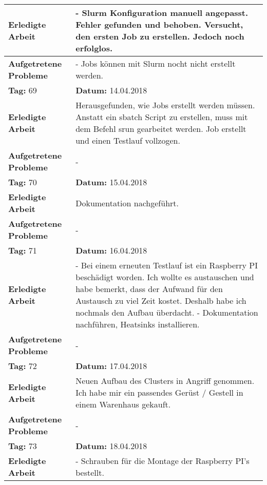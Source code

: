 \begin{longtable}{|p{5cm}|p{5cm}p{6cm}|}
\textbf{Erledigte Arbeit} & \multicolumn{2}{p{11cm}|}{- Slurm Konfiguration manuell angepasst. Fehler gefunden und behoben. Versucht, den ersten Job zu erstellen. Jedoch noch erfolglos.} \\ \hline
\textbf{Aufgetretene Probleme} & \multicolumn{2}{p{11cm}|}{- Jobs können mit Slurm nocht nicht erstellt werden.} \\ \hline
\rowcolor{heading}\textbf{Tag:} 69 & \textbf{Datum:} 14.04.2018 & \\ \hline
\textbf{Erledigte Arbeit} & \multicolumn{2}{p{11cm}|}{Herausgefunden, wie Jobs erstellt werden müssen. Anstatt ein sbatch Script zu erstellen, muss mit dem Befehl srun gearbeitet werden. Job erstellt und einen Testlauf vollzogen.} \\ \hline
\textbf{Aufgetretene Probleme} & \multicolumn{2}{p{11cm}|}{-} \\ \hline
\rowcolor{heading}\textbf{Tag:} 70 & \textbf{Datum:} 15.04.2018 & \\ \hline
\textbf{Erledigte Arbeit} & \multicolumn{2}{p{11cm}|}{Dokumentation nachgeführt.} \\ \hline
\textbf{Aufgetretene Probleme} & \multicolumn{2}{p{11cm}|}{-} \\ \hline
\rowcolor{heading}\textbf{Tag:} 71 & \textbf{Datum:} 16.04.2018 & \\ \hline
\textbf{Erledigte Arbeit} & \multicolumn{2}{p{11cm}|}{- Bei einem erneuten Testlauf ist ein Raspberry PI beschädigt worden. Ich wollte es austauschen und habe bemerkt, dass der Aufwand für den Austausch zu viel Zeit kostet. Deshalb habe ich nochmals den Aufbau überdacht. \newline 
- Dokumentation nachführen, Heatsinks installieren.} \\ \hline
\textbf{Aufgetretene Probleme} & \multicolumn{2}{p{11cm}|}{-} \\ \hline
\rowcolor{heading}\textbf{Tag:} 72 & \textbf{Datum:} 17.04.2018 & \\ \hline
\textbf{Erledigte Arbeit} & \multicolumn{2}{p{11cm}|}{Neuen Aufbau des Clusters in Angriff genommen. Ich habe mir ein passendes Gerüst / Gestell in einem Warenhaus gekauft. } \\ \hline
\textbf{Aufgetretene Probleme} & \multicolumn{2}{p{11cm}|}{-} \\ \hline
\rowcolor{heading}\textbf{Tag:} 73 & \textbf{Datum:} 18.04.2018 & \\ \hline
\textbf{Erledigte Arbeit} & \multicolumn{2}{p{11cm}|}{- Schrauben für die Montage der Raspberry PI's bestellt. \newline
}
\end{longtable}
